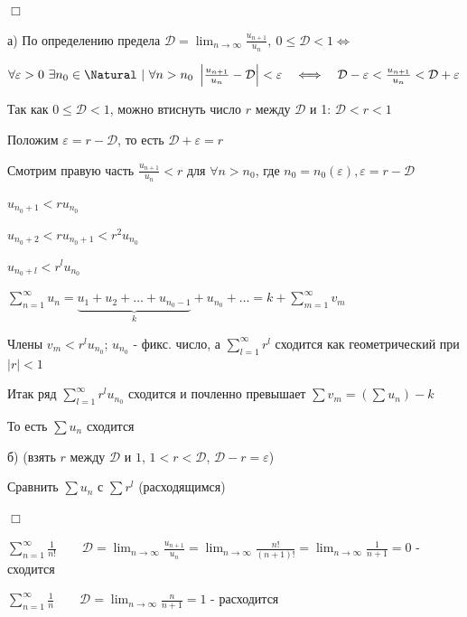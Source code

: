 \documentclass[12pt]{article}
\begin{document}
    \begin{MyProof}
        $\Box$

        а) По определению предела $\mathcal{D} = \lim_{n \to \infty} \frac{u_{n + 1}}{u_n}, \ 0 \leq \mathcal{D} < 1 \Longleftrightarrow$

        $\forall \varepsilon > 0 \ \exists n_0 \in \Natural \ | \ \forall n > n_0 \ \left|\frac{u_{n + 1}}{u_n} - \mathcal{D}\right| < \varepsilon \quad \Longleftrightarrow \quad \mathcal{D} - \varepsilon < \frac{u_{n + 1}}{u_n} < \mathcal{D} + \varepsilon$

        Так как $0 \leq \mathcal{D} < 1$, можно втиснуть число $r$ между $\mathcal{D}$ и 1: $\mathcal{D} < r < 1$

        Положим $\varepsilon = r - \mathcal{D}$, то есть $\mathcal{D} + \varepsilon = r$

        Смотрим правую часть $\frac{u_{n + 1}}{u_n} < r$ для $\forall n > n_0$, где $n_0 = n_0(\varepsilon), \varepsilon = r - \mathcal{D}$

        $u_{n_0 + 1} < r u_{n_0}$

        $u_{n_0 + 2} < r u_{n_0 + 1} < r^2 u_{n_0}$

        $u_{n_0 + l} < r^l u_{n_0}$

        $\sum_{n = 1}^\infty u_n = \underset{k}{\underbrace{u_1 + u_2 + \dots + u_{n_0 - 1}}} + u_{n_0} + \dots = k + \sum_{m = 1}^\infty v_m $ %

        Члены $v_m < r^l u_{n_0}$; $u_{n_0}$ - фикс. число, а $\sum_{l = 1}^\infty r^l$ сходится как геометрический при $|r| < 1$

        Итак ряд $\sum_{l = 1}^\infty r^l u_{n_0}$ сходится и почленно превышает $\sum v_m = \left(\sum u_n\right) - k$

        То есть $\sum u_n$ сходится

        б) \Lab (взять $r$ между $\mathcal{D}$ и $1$, $1 < r < \mathcal{D}$, $\mathcal{D} - r = \varepsilon$)

        Сравнить $\sum u_n$ с $\sum r^l$ (расходящимся)

        $\Box$
    \end{MyProof}

     $\sum_{n = 1}^\infty \frac{1}{n!} \quad\quad \mathcal{D} = \lim_{n \to \infty} \frac{u_{n + 1}}{u_n} = \lim_{n \to \infty} \frac{n!}{(n + 1)!} = \lim_{n \to \infty} \frac{1}{n + 1} = 0$ - сходится

     $\sum_{n = 1}^\infty \frac{1}{n} \quad\quad \mathcal{D} = \lim_{n \to \infty} \frac{n}{n + 1} = 1$ - расходится
\end{document}

